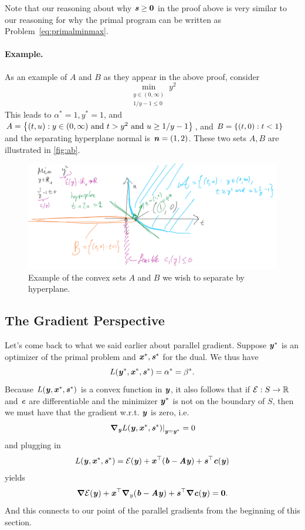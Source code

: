 \begin{remark*}
  Note that our reasoning about why $\boldsymbol{\mathit{s}} \geq \boldsymbol{0}$ in the proof
  above is very similar to our reasoning for why the primal program
  can be written as Problem~\eqref{eq:primalminmax}.
\end{remark*}

\paragraph{Example.}
As an example of $A$ and $B$ as they appear in the above proof,
consider
\[
\min_{\substack{y \in (0,\infty) \\ 1/y
    -1 \leq 0}}
y^2
\]
 This leads to $\alpha^* = 1,
    y^* =1$, and $A = \left\{ (t,u): y \in (0,\infty) \text{ and } t >y^2
       \text{ and } u \geq 1/y-1 \right\}$, and $B = \left\{ (t,0) : t < 1 \right\}$ and the separating hyperplane normal is $\boldsymbol{\mathit{n}} = (1,2)$.
These two sets $A,B$ are illustrated in \autoref{fig:ab}.
\begin{figure}[H]
  \centering
  \includegraphics[width=.9\textwidth]{fig/lec12-the-sets-a-b.jpg}
  \caption{Example of the convex sets $A$ and $B$ we wish to separate by hyperplane.}
\label{fig:ab}
\end{figure}



\subsection{The Gradient Perspective}
Let's come back to what we said earlier about parallel gradient.
Suppose $\boldsymbol{\mathit{y}}^*$ is an optimizer of the primal problem and $\boldsymbol{\mathit{x}}^*, \boldsymbol{\mathit{s}}^*$ for the dual.
We thus have
\[ L(\boldsymbol{\mathit{y}}^*, \boldsymbol{\mathit{x}}^*, \boldsymbol{\mathit{s}}^*) = \alpha^* = \beta^*. \]
Because $L(\boldsymbol{\mathit{y}}, \boldsymbol{\mathit{x}}^*, \boldsymbol{\mathit{s}}^*)$ is a convex function in $\boldsymbol{\mathit{y}}$, it also
follows that if $\mathcal{E}: S \to \mathbb{R}$ and $\boldsymbol{\mathit{c}}$ are differentiable and the minimizer
$\boldsymbol{\mathit{y}}^*$ is not on the boundary of $S$, then we must have that the
gradient w.r.t. $\boldsymbol{\mathit{y}}$ is zero, i.e.
\begin{equation*} \left.\boldsymbol{\nabla}_{\boldsymbol{\mathit{y}}}L(\boldsymbol{\mathit{y}}, \boldsymbol{\mathit{x}}^*, \boldsymbol{\mathit{s}}^*)\right|_{\boldsymbol{\mathit{y}}=\boldsymbol{\mathit{y}}^*} = 0 \end{equation*}
and plugging in
\[ L(\boldsymbol{\mathit{y}}, \boldsymbol{\mathit{x}}^*, \boldsymbol{\mathit{s}}^*) = \mathcal{E}(\boldsymbol{\mathit{y}}) + \boldsymbol{\mathit{x}}^{\top}(\boldsymbol{\mathit{b}} - \boldsymbol{\mathit{A}}\boldsymbol{\mathit{y}}) + \boldsymbol{\mathit{s}}^{\top}\boldsymbol{\mathit{c}}(\boldsymbol{\mathit{y}}) \]
yields
\begin{equation*} \boldsymbol{\nabla}\mathcal{E}(\boldsymbol{\mathit{y}}) + \boldsymbol{\mathit{x}}^{\top}\boldsymbol{\nabla}_y(\boldsymbol{\mathit{b}}-\boldsymbol{\mathit{A}}\boldsymbol{\mathit{y}}) + \boldsymbol{\mathit{s}}^{\top}\boldsymbol{\nabla}\boldsymbol{\mathit{c}}(\boldsymbol{\mathit{y}}) = \boldsymbol{0}. \end{equation*}
And this connects to our point of the parallel gradients from the beginning of this section.

